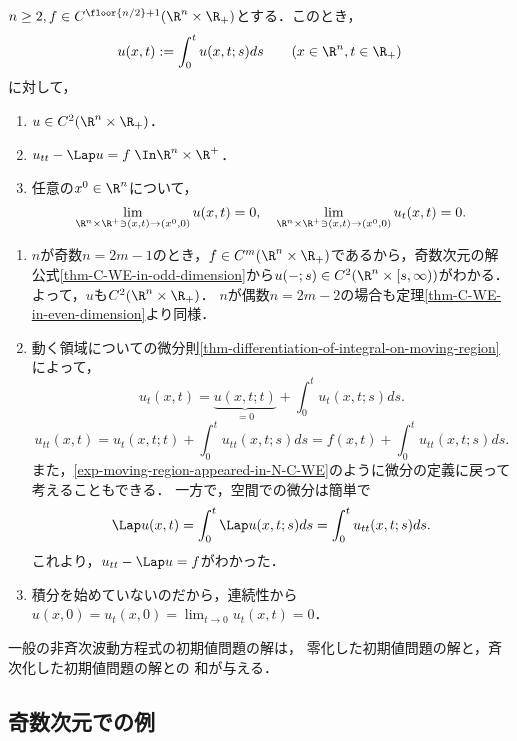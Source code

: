 \documentclass[uplatex,dvipdfmx]{jsreport}
\begin{document}
\begin{theorem}[非斉次波動方程式の解]\label{thm-solution-to-N-C-WE-in-Rn}
    $n\ge2,f\in C^{\floor{n/2}+1}(\R^n\times\R_+)$とする．このとき，
    \[u(x,t):=\int_0^tu(x,t;s)ds\qquad(x\in\R^n,t\in\R_+)\]
    に対して，
    \begin{enumerate}
        \item $u\in C^2(\R^n\times\R_+)$．
        \item $u_{tt}-\Lap u=f\;\In\R^n\times\R^+$．
        \item 任意の$x^0\in\R^n$について，
        \[\lim_{\R^n\times\R^+\ni(x,t)\to(x^0,0)}u(x,t)=0,\quad\lim_{\R^n\times\R^+\ni(x,t)\to(x^0,0)}u_t(x,t)=0.\]
    \end{enumerate}
\end{theorem}
\begin{Proof}\mbox{}
    \begin{enumerate}
        \item $n$が奇数$n=2m-1$のとき，$f\in C^m(\R^n\times\R_+)$であるから，奇数次元の解公式\ref{thm-C-WE-in-odd-dimension}から$u(-;s)\in C^2(\R^n\times[s,\infty))$がわかる．
        よって，$u$も$C^2(\R^n\times\R_+)$．
        $n$が偶数$n=2m-2$の場合も定理\ref{thm-C-WE-in-even-dimension}より同様．
        \item 動く領域についての微分則\ref{thm-differentiation-of-integral-on-moving-region}によって，
        \[u_t(x,t)=\underbrace{u(x,t;t)}_{=0}+\int^t_0u_t(x,t;s)ds.\]
        \[u_{tt}(x,t)=u_t(x,t;t)+\int^t_0u_{tt}(x,t;s)ds=f(x,t)+\int^t_0u_{tt}(x,t;s)ds.\]
        また，\ref{exp-moving-region-appeared-in-N-C-WE}のように微分の定義に戻って考えることもできる．
        一方で，空間での微分は簡単で
        \[\Lap u(x,t)=\int_0^t\Lap u(x,t;s)ds=\int_0^t u_{tt}(x,t;s)ds.\]
        これより，$u_{tt}-\Lap u=f$がわかった．
        \item 積分を始めていないのだから，連続性から$u(x,0)=u_t(x,0)=\lim_{t\to0}u_t(x,t)=0$．
    \end{enumerate}
\end{Proof}

\begin{corollary}
    一般の非斉次波動方程式の初期値問題の解は，
    零化した初期値問題の解と，斉次化した初期値問題の解との
    和が与える．
\end{corollary}

\subsection{奇数次元での例}
\end{document}
